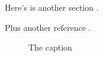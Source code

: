 %
%
%
%


\startdocument			%
%
%

Here's is another section \label{second}.

%
% 
Plus another reference .

\begin{figure}
\caption{The caption}
\end{figure}

%
%
